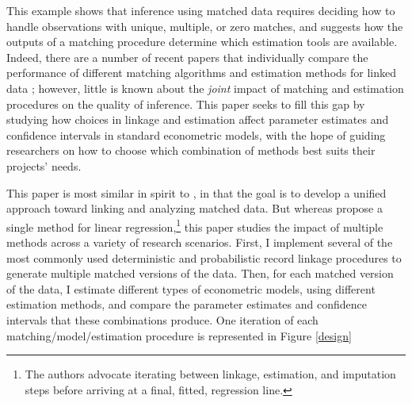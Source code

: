 \documentclass[12pt]{article}
\begin{document}
This example shows that inference using matched data requires deciding how to handle observations with unique, multiple, or zero matches, and suggests how the outputs of a matching procedure determine which estimation tools are available.  Indeed, there are a number of recent papers that individually compare the performance of different matching algorithms  \citep{bailey2017, arp2018} and estimation methods for linked data \citep{harron2014}; however, little is known about the \textit{joint} impact of matching and estimation procedures on the quality of inference.  This paper seeks to fill this gap by studying how choices in linkage and estimation affect parameter estimates and confidence intervals in standard econometric models, with the hope of guiding researchers on how to choose which combination of methods best suits their projects' needs. 
 
This paper is most similar in spirit to \cite{sw1997}, in that the goal is to develop a unified approach toward linking and analyzing matched data.  But whereas \cite{sw1997} propose a single method for linear regression,\footnote{The authors advocate iterating between linkage, estimation, and imputation steps before arriving at a final, fitted, regression line.} this paper studies the impact of multiple methods across a variety of research scenarios.  First, I implement several of the most commonly used deterministic and probabilistic record linkage procedures to generate multiple matched versions of the data.  Then, for each matched version of the data, I estimate different types of econometric models, using different estimation methods, and compare the parameter estimates and confidence intervals that these combinations produce.  One iteration of each matching/model/estimation procedure is represented in Figure \ref{design}
\end{document}
